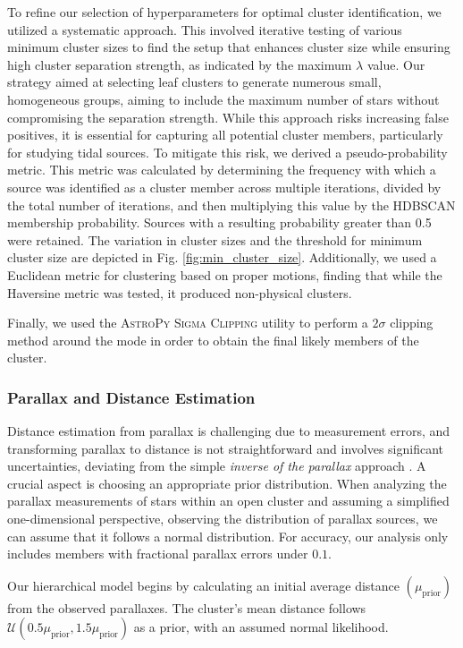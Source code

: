 \documentclass[fleqn,usenatbib,usedcolumn,useAMS]{mnras}
\begin{document}
To refine our selection of hyperparameters for optimal cluster identification, we utilized a systematic approach. This involved iterative testing of various minimum cluster sizes to find the setup that enhances cluster size while ensuring high cluster separation strength, as indicated by the maximum $\lambda$ value. Our strategy aimed at selecting leaf clusters to generate numerous small, homogeneous groups, aiming to include the maximum number of stars without compromising the separation strength. While this approach risks increasing false positives, it is essential for capturing all potential cluster members, particularly for studying tidal sources. To mitigate this risk, we derived a pseudo-probability metric. This metric was calculated by determining the frequency with which a source was identified as a cluster member across multiple iterations, divided by the total number of iterations, and then multiplying this value by the HDBSCAN membership probability. Sources with a resulting probability greater than 0.5 were retained. The variation in cluster sizes and the threshold for minimum cluster size are depicted in Fig. \ref{fig:min_cluster_size}. Additionally, we used a Euclidean metric for clustering based on proper motions, finding that while the Haversine metric was tested, it produced non-physical clusters.

Finally, we used the \textsc{AstroPy Sigma Clipping} \citep{astropy:2013,astropy:2018,astropy:2022} utility to perform a $2\sigma$ clipping method around the mode in order to obtain the final likely members of the cluster.

\subsubsection{Parallax and Distance Estimation}
Distance estimation from parallax is challenging due to measurement errors, and transforming parallax to distance is not straightforward and involves significant uncertainties, deviating from the simple \textit{inverse of the parallax} approach \citep{2015PASP..127..994B,2021AJ....161..147B}. A crucial aspect is choosing an appropriate prior distribution. When analyzing the parallax measurements of stars within an open cluster and assuming a simplified one-dimensional perspective, observing the distribution of parallax sources, we can assume that it follows a normal distribution. For accuracy, our analysis only includes members with fractional parallax errors under $0.1$.

Our hierarchical model begins by calculating an initial average distance $(\mu_{\mathrm{prior}})$ from the observed parallaxes. The cluster's mean distance follows $\mathcal{U}(0.5\mu_{\mathrm{prior}},1.5\mu_{\mathrm{prior}})$ as a prior, with an assumed normal likelihood.
\end{document}
